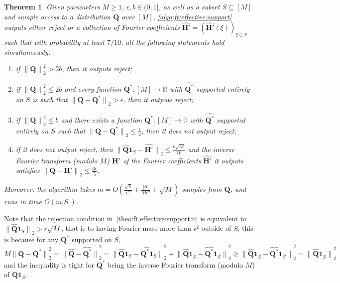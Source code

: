 \documentclass[11pt]{article}
\newtheorem{theorem}{Theorem}[section]
\theoremstyle{definition}
\newcommand{\R}{\mathbb{R}}
\newcommand{\q}{\mathbf{Q}}
\newcommand{\h}{\mathbf{H}}
\newcommand{\eps}{\epsilon}
\newcommand{\abs}[1]{\lvert#1\rvert}
\newcommand{\norm}[1]{\lVert#1\rVert}
\newcommand{\normtwo}[1]{{\norm{#1}}_2}
\renewcommand{\abs}[1]{\left\lvert #1 \right\rvert}
\newcommand{\reject}{\textsf{reject}\xspace}
\newcommand{\bigO}[1]{{O\left( #1 \right)}}
\newcommand{\fourier}[1]{\widehat{#1}}
\begin{document}
\begin{theorem}\label{theo:ft:effective:support}
    Given parameters $M\geq 1$, $\eps,b\in(0,1]$, as well as a subset $S\subseteq [M]$ and sample access to a distribution $\q$ over $[M]$, \cref{algo:ft:effective:support} outputs either \reject or a collection of Fourier coefficients $\fourier{\h'}=(\fourier{\h'}(\xi))_{\xi\in S}$ such that with probability at least $7/10$, all the following statements hold simultaneously.
    \begin{enumerate}
        \item\label{theo:ft:effective:support:i} if $\normtwo{\q}^2 > 2b$, then it outputs \reject;
        \item\label{theo:ft:effective:support:ii} if $\normtwo{\q}^2 \leq 2b$ and every function $\q^\ast\colon[M]\to\R$ with $\fourier{\q^\ast}$ supported entirely on $S$ is such that $\normtwo{\q-\q^\ast} > \eps$, then it outputs \reject;
        \item\label{theo:ft:effective:support:iii} if $\normtwo{\q}^2 \leq b$ and there exists a function $\q^\ast\colon[M]\to\R$ with $\fourier{\q^\ast}$ supported entirely on $S$ such that $\normtwo{\q-\q^\ast} \leq \frac{\eps}{2}$, then it does not output \reject;
        \item\label{theo:ft:effective:support:iv} if it does not output \reject, then $\normtwo{\fourier{\q}\mathbf{1}_S-\fourier{\h'}} \leq \frac{\eps\sqrt{M}}{10}$ and the inverse Fourier transform (modulo $M$) $\h'$ of the Fourier coefficients $\fourier{\h'}$ it outputs satisfies $\normtwo{\q-\h'} \leq \frac{6\eps}{5}$.
    \end{enumerate}
    Moreover, the algorithm takes $m=\bigO{\frac{\sqrt{b}}{\eps^2}+ \frac{\abs{S}}{M\eps^2} +\sqrt{M}}$ samples from $\q$, and runs in time $\bigO{m\abs{S}}$.
\end{theorem}
Note that the rejection condition in~\cref{theo:ft:effective:support:ii} is equivalent to $\normtwo{\fourier{\q}\mathbf{1}_{\bar{S}}} > \eps\sqrt{M}$, that is to having Fourier mass more than $\eps^2$ outside of $S$; this is because for any $\q^\ast$ supported on $S$,
\[
    M\normtwo{\q-\q^\ast}^2 = \normtwo{\fourier{\q}-\fourier{\q^\ast}}^2
    = \normtwo{\fourier{\q}\mathbf{1}_{S}-\fourier{\q^\ast}\mathbf{1}_{S}}^2 + \normtwo{\fourier{\q}\mathbf{1}_{\bar{S}}-\fourier{\q^\ast}\mathbf{1}_{\bar{S}}}^2
    \geq \normtwo{\fourier{\q}\mathbf{1}_{\bar{S}}-\fourier{\q^\ast}\mathbf{1}_{\bar{S}}}^2
    = \normtwo{\fourier{\q}\mathbf{1}_{\bar{S}}}^2
\]
and the inequality is tight for $\q^\ast$ being the inverse Fourier transform (modulo $M$) of $\fourier{\q}\mathbf{1}_{S}$.
\end{document}
